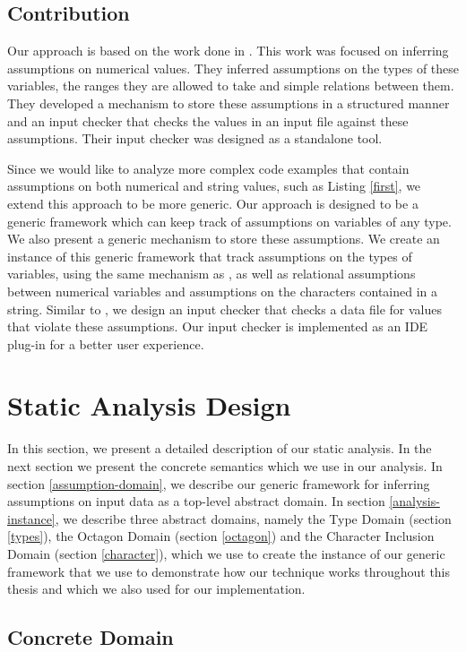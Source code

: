 \documentclass[10pt]{report}
\begin{document}
\section{Contribution}

Our approach is based on the work done in \cite{madelin}. This work was focused on inferring assumptions on numerical values. They inferred assumptions on the types of these variables, the ranges they are allowed to take and simple relations between them. They developed a mechanism to store these assumptions in a structured manner and an input checker that checks the values in an input file against these assumptions. Their input checker was designed as a standalone tool. 

Since we would like to analyze more complex code examples that contain assumptions on both numerical and string values, such as Listing \ref{first}, we extend this approach to be more generic. Our approach is designed to be a generic framework which can keep track of assumptions on variables of any type. We also present a generic mechanism to store these assumptions. We create an instance of this generic framework that track assumptions on the types of variables, using the same mechanism as \cite{madelin}, as well as relational assumptions between numerical variables and assumptions on the characters contained in a string. Similar to \cite{madelin}, we design an input checker that checks a data file for values that violate these assumptions. Our input checker is implemented as an IDE plug-in for a better user experience. 

\chapter{Static Analysis Design} \label{analysis}
In this section, we present a detailed description of our static analysis. In the next section we present the concrete semantics which we use in our analysis. In section \ref{assumption-domain}, we describe our generic framework for inferring assumptions on input data as a top-level abstract domain. In section \ref{analysis-instance}, we describe three abstract domains, namely the Type Domain (section \ref{types}), the Octagon Domain (section \ref{octagon}) and the Character Inclusion Domain (section \ref{character}), which we use to create the instance of our generic framework that we use to demonstrate how our technique works throughout this thesis and which we also used for our implementation. 
\section{Concrete Domain} \label{concrete}
\end{document}
